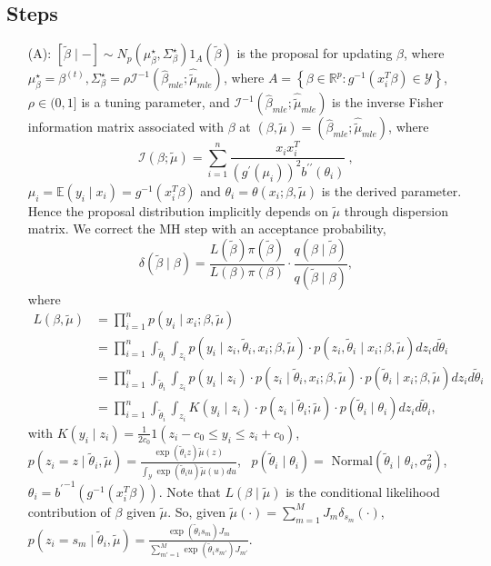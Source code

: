 \documentclass[10pt, oneside]{article}   	%
\renewcommand{\th}{\theta}
\newcommand{\sy}{\mathcal{Y}}
\newcommand{\E}{\mathbb{E}}
\newcommand{\R}{\mathbb{R}}
\renewcommand{\sy}{\mathcal{Y}}
\newcommand{\tmu}{\widetilde{\mu}}
\begin{document}
\subsection{Steps}
\begin{itemize}
    \item[(A):] $[\widetilde \beta \mid -] \sim N_p(\mu^\star_\beta, \Sigma^\star_\beta) 1_A\left(\widetilde{\beta}\right)$ is the proposal for updating $\beta$, where $\mu^\star_\beta = \beta^{(t)}, \Sigma^\star_\beta = \rho  \mathcal{I}^{-1}\left(\widehat \beta_{mle} ; \widehat {\widetilde \mu}_{mle}\right)$, where $A = \left\{\beta \in \R^p :  g^{-1}\left(x_i^T \beta \right) \in \sy \right \}$, $\rho \in (0,1]$ is a tuning parameter, and $ \mathcal{I}^{-1}\left(\widehat \beta_{mle} ; \widehat {\widetilde \mu}_{mle}\right)$ is the inverse Fisher information matrix associated with $\beta$ at $(\beta, \tmu) = \left(\widehat \beta_{mle} ; \widehat {\widetilde \mu}_{mle}\right)$, where
    \[\mathcal{I}\left(\beta ; {\widetilde \mu}\right) = \sum_{i=1}^n  \frac{x_i x_i^T}{\left(g^{\prime}\left(\mu_i\right)\right)^2 b^{\prime \prime}\left(\theta_i\right)} \ ,\]
    $\mu_i = \E(y_i \mid x_i) = g^{-1}(x^T_i \beta)$ and $\th_i = \th(x_i; \beta, \tmu)$ is the derived parameter. Hence the proposal distribution implicitly depends on $\tmu$ through dispersion matrix. We correct the MH step with an acceptance probability,
    $$
    \delta(\widetilde \beta \mid \beta) = \frac{L(\widetilde \beta) \pi(\widetilde \beta)}{L(\beta) \pi(\beta)} \cdot \frac{q(\beta \mid \widetilde \beta)}{q(\widetilde \beta \mid \beta)},
    $$
    where 
    \begin{align*}
        L(\beta, \tmu) & = \prod_{i=1}^n p(y_i \mid x_i; \beta, \tmu) \\
        & = \prod_{i=1}^n \int_{\widetilde \th_i} \int_{z_i} p(y_i \mid z_i, \widetilde \th_i, x_i; \beta, \tmu) \cdot p(z_i, \widetilde \th_i \mid x_i; \beta, \tmu) dz_i  d{\widetilde \th_i}\\
        & = \prod_{i=1}^n \int_{\widetilde \th_i} \int_{z_i} p(y_i \mid z_i) \cdot p(z_i \mid \widetilde \th_i, x_i; \beta, \tmu) \cdot p(\widetilde \th_i \mid x_i; \beta, \tmu) dz_i  d{\widetilde \th_i}\\
        & = \prod_{i=1}^n \int_{\widetilde \th_i} \int_{z_i} K(y_i \mid z_i) \cdot p(z_i \mid \widetilde \th_i; \tmu) \cdot p(\widetilde \th_i \mid \th_i) dz_i  d{\widetilde \th_i},
    \end{align*}
    with $K(y_i \mid z_i) = \frac{1}{2c_0} 1(z_i - c_0 \leq y_i \leq z_i + c_0)$, \ $p(z_i = z \mid \widetilde \th_i, \tmu) = \frac{\exp(\widetilde \th_i z)\widetilde \mu(z)}{\int_\sy \exp(\widetilde \th_i u) \widetilde \mu(u) du}$, \ $p(\widetilde \th_i \mid \th_i) = \text{ Normal}(\widetilde \th_i \mid \th_i, \sigma^2_\th)$, $\th_i = {b^\prime}^{-1} (g^{-1}(x^T_i\beta))$. Note that $L(\beta \mid \tmu)$ is the conditional likelihood contribution of $\beta$ given $\tmu$. So, given $\widetilde \mu(\cdot) = \sum_{m = 1}^M J_m \delta_{s_m}(\cdot)$, \ $p(z_i = s_m \mid \widetilde \th_i, \tmu) = \frac{\exp(\widetilde \th_i s_m) J_m}{\sum_{m'=1}^M \exp(\widetilde \th_i s_{m'}) J_{m'}}$. 

\end{itemize}
\end{document}
